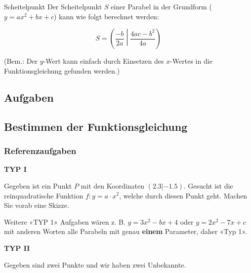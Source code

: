 \begin{gesetz}{Scheitelpunkt}{}
  Der Scheitelpunkt $S$ einer Parabel in der Grundform ($y=ax^2+bx+c$) kann wie folgt
  berechnet werden:

  $$S=\left(\frac{-b}{2a}\middle|\frac{4ac-b^2}{4a}\right)$$

  (Bem.: Der $y$-Wert kann einfach durch Einsetzen des $x$-Wertes in
  die Funktionsgleichung gefunden werden.)
  \end{gesetz}
  
\subsection*{Aufgaben}

\newpage

\subsection{Bestimmen der Funktionsgleichung}

\subsubsection{Referenzaufgaben}

\textbf{TYP I}

Gegeben ist ein Punkt $P$ mit den Koordinaten $(2.3 | -1.5)$. Gesucht ist die reinquadratische Funktion $f: y=a\cdot{}x^2$, welche durch diesen Punkt geht.
Machen Sie vorab eine Skizze.




Weitere «TYP 1» Aufgaben wären z. B. $y = 3x^2 - bx + 4$ oder $y=2x^2
-7x + c$ mit anderen Worten alle Parabeln mit genau \textbf{einem}
Parameter, daher «Typ 1».

\newpage



\textbf{TYP II}

Gegeben sind zwei Punkte und wir haben zwei Unbekannte.

